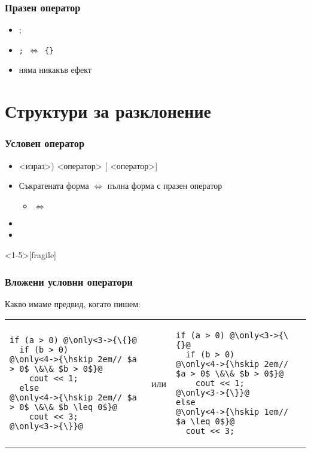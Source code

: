 \documentclass[alsotrans]{beamerswitch}
\begin{document}
\begin{frame}
  \frametitle{Празен оператор}
  \begin{itemize}
  \item \tta;
  \item \tt; $\Leftrightarrow$ \tt{\{\}}
  \item няма никакъв ефект
  \end{itemize}
\end{frame}

\section{Структури за разклонение}

\begin{frame}
  \frametitle{Условен оператор}

  \begin{itemize}[<+->]
  \item {}<израз>\tta) <оператор> [ <оператор>]
  \item Съкратената форма $\Leftrightarrow$ пълна форма с празен оператор
    \begin{itemize}
    \item {} $\Leftrightarrow$ 
    \end{itemize}
  \item \exa {}
  \item \exa {}
  \end{itemize}
\end{frame}

\begin{frame}<1-5>[fragile]
  \frametitle{Вложени условни оператори}

  Какво имаме предвид, когато пишем:
  \\[1em]
  \pause
  \begin{tabular}{l@{\hskip 6em}c@{\hskip 4em}l}
\begin{lstlisting}
if (a > 0) @\only<3->{\{}@
  if (b > 0)
@\only<4->{\hskip 2em// $a > 0$ \&\& $b > 0$}@
    cout << 1;
  else
@\only<4->{\hskip 2em// $a > 0$ \&\& $b \leq 0$}@
    cout << 3;
@\only<3->{\}}@
\end{lstlisting}%
    &или&%
\begin{lstlisting}
if (a > 0) @\only<3->{\{}@
  if (b > 0)
@\only<4->{\hskip 2em// $a > 0$ \&\& $b > 0$}@
    cout << 1;
@\only<3->{\}}@
else
@\only<4->{\hskip 1em// $a \leq 0$}@
  cout << 3;
\end{lstlisting}
  \end{tabular}
\end{frame}
\end{document}
